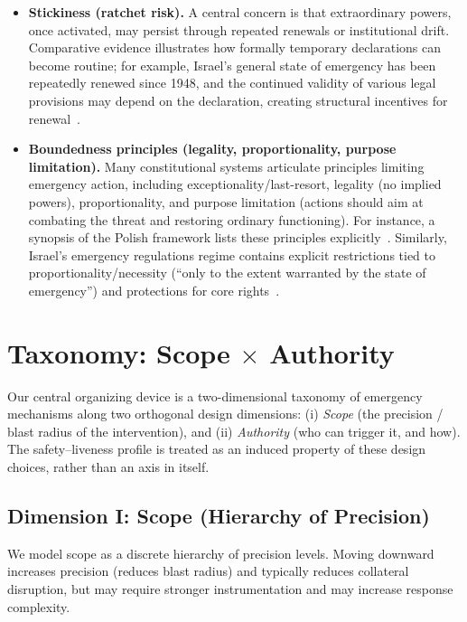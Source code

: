 \documentclass[12pt]{article}
\begin{document}
\begin{itemize}
    \item \textbf{Stickiness (ratchet risk).}
    A central concern is that extraordinary powers, once activated, may persist through repeated
    renewals or institutional drift. Comparative evidence illustrates how formally temporary
    declarations can become routine; for example, Israel's general state of emergency has been
    repeatedly renewed since 1948, and the continued validity of various legal provisions may depend
    on the declaration, creating structural incentives for renewal~\cite{gimpelson2016law}.
    \item \textbf{Boundedness principles (legality, proportionality, purpose limitation).}
    Many constitutional systems articulate principles limiting emergency action, including
    exceptionality/last-resort, legality (no implied powers), proportionality, and purpose limitation
    (actions should aim at combating the threat and restoring ordinary functioning). For instance, a
    synopsis of the Polish framework lists these principles explicitly~\cite{gimpelson2016law}.
    Similarly, Israel's emergency regulations regime contains explicit restrictions tied to
    proportionality/necessity (``only to the extent warranted by the state of emergency'') and
    protections for core rights~\cite{gimpelson2016law}.
\end{itemize}
\fi


\section{Taxonomy: Scope \texorpdfstring{$\times$}{x} Authority}
\label{sec:taxonomy}

Our central organizing device is a two-dimensional taxonomy of emergency mechanisms along two orthogonal design dimensions:
(i) \emph{Scope} (the precision / blast radius of the intervention), and (ii) \emph{Authority} (who can trigger it, and how).
The safety--liveness profile is treated as an induced property of these design choices, rather than an axis in itself.


\subsection{Dimension I: Scope (Hierarchy of Precision)}
\label{sec:taxonomy-scope}

We model scope as a discrete hierarchy of precision levels. Moving downward increases precision (reduces blast radius)
and typically reduces collateral disruption, but may require stronger instrumentation and may increase response complexity.
\end{document}

